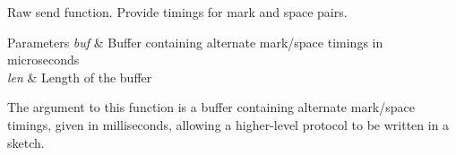 Raw send function. Provide timings for mark and space pairs. 


\begin{DoxyParams}{Parameters}
{\em buf} & Buffer containing alternate mark/space timings in microseconds \\
\hline
{\em len} & Length of the buffer\\
\hline
\end{DoxyParams}
The argument to this function is a buffer containing alternate mark/space timings, given in milliseconds, allowing a higher-\/level protocol to be written in a sketch. 